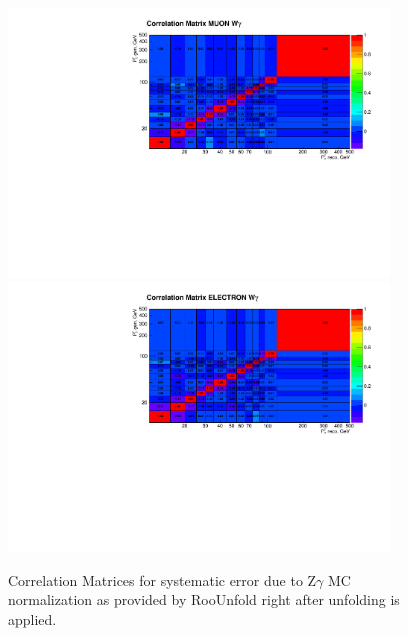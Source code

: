 \begin{figure}[htb]
  \begin{center}
   \includegraphics[width=0.90\textwidth]{../figs/figs_v11/MUON_WGamma/Constants/matrCorrelation_syst_ZgMC_Norm.pdf}\\
\includegraphics[width=0.90\textwidth]{../figs/figs_v11/ELECTRON_WGamma/Constants/matrCorrelation_syst_ZgMC_Norm.pdf}
  \caption{Correlation Matrices for systematic error due to Z$\gamma$ MC normalization as provided by RooUnfold right after unfolding is applied.}
  \label{fig:corrMatrices_syst_ZgMC_Norm_Wg}
  \end{center}
\end{figure}

